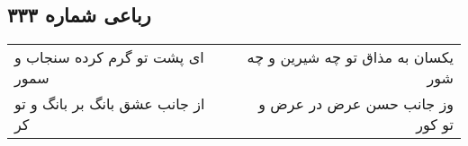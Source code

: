 \begin{center}
\section*{رباعی شماره ۳۳۳}
\label{sec:sh333}
\begin{longtable}{l p{0.5cm} r}
ای پشت تو گرم کرده سنجاب و سمور
&&
یکسان به مذاق تو چه شیرین و چه شور
\\
از جانب عشق بانگ بر بانگ و تو کر
&&
وز جانب حسن عرض در عرض و تو کور
\\
\end{longtable}
\end{center}
